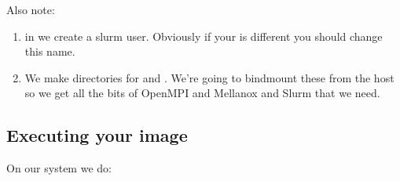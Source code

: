 \documentclass[letterpaper,10pt,english]{sphinxmanual}
\begin{document}
\begin{sphinxVerbatim}[commandchars=\\\{\}]











\end{sphinxVerbatim}

Also note:
\begin{enumerate}
\item {} 
in  we create a slurm user. Obviously if your  is different you should change this name.

\item {} 
We make directories for  and . We’re going to bindmount these from the host so we get
all the bits of OpenMPI and Mellanox and Slurm that we need.

\end{enumerate}


\subsection{Executing your image}
\label{\detokenize{appendix:executing-your-image}}
On our system we do:
\end{document}
